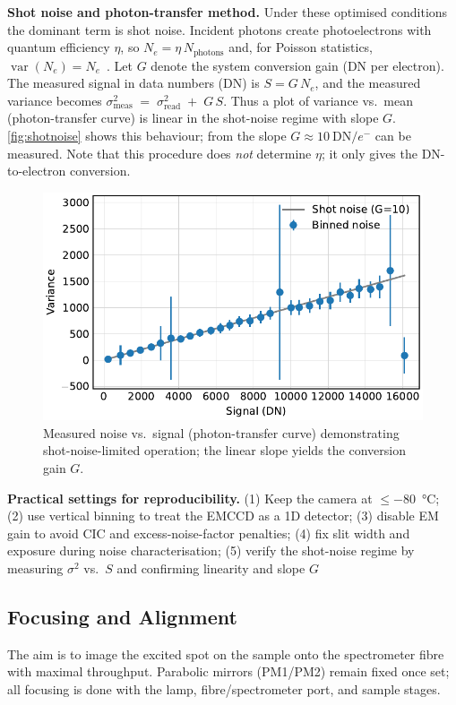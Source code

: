 \documentclass[
	a4paper,
]{scrarticle}
\begin{document}
\textbf{Shot noise and photon-transfer method.}
Under these optimised conditions the dominant term is shot noise.
Incident photons create photoelectrons with quantum efficiency \(\eta\), so \(N_e=\eta\,N_{\text{photons}}\) and, for Poisson statistics, \(\operatorname{var}(N_e)=N_e\)~\cite{europeanmachinevisionassociationStandardCharacterizationImage2010}.
Let \(G\) denote the system conversion gain (DN per electron). The measured signal in data numbers (DN) is \(S = G\,N_e\), and the measured variance becomes \(\sigma^2_{\text{meas}} \;=\; \sigma_{\text{read}}^2 \;+\; G\,S\).
Thus a plot of variance vs.\ mean (photon-transfer curve) is linear in the shot-noise regime with slope \(G\).
\autoref{fig:shotnoise} shows this behaviour; from the slope \(G \approx 10~\text{DN}/e^{-}\) can be measured.
Note that this procedure does \emph{not} determine \(\eta\); it only gives the DN-to-electron conversion.

\begin{figure}[h]
    \centering
    \includegraphics{../analysis/figures/shot noise.pdf}
    \caption{Measured noise vs.\ signal (photon-transfer curve) demonstrating shot-noise-limited operation; the linear slope yields the conversion gain \(G\).}
    \label{fig:shotnoise}
\end{figure}

\textbf{Practical settings for reproducibility.}
(1) Keep the camera at \(\leq\)\SI{-80}{\degreeCelsius}; (2) use vertical binning to treat the EMCCD as a 1D detector; (3) disable EM gain to avoid CIC and excess-noise-factor penalties; (4) fix slit width and exposure during noise characterisation; (5) verify the shot-noise regime by measuring \(\sigma^2\) vs.\ \(S\) and confirming linearity and slope \(G\)

\subsection{Focusing and Alignment}
The aim is to image the excited spot on the sample onto the spectrometer fibre with maximal throughput. Parabolic mirrors (PM1/PM2) remain fixed once set; all focusing is done with the lamp, fibre/spectrometer port, and sample stages.
\end{document}
